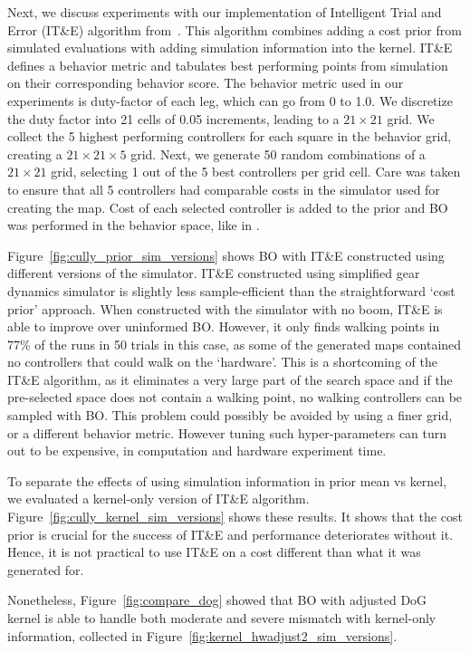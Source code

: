Next, we discuss experiments with our implementation of Intelligent Trial and Error (IT\&E) algorithm from~\citet{cully2015robots}. This algorithm combines adding a cost prior from simulated evaluations with adding simulation information into the kernel. IT\&E defines a behavior metric and tabulates best performing points from simulation on their corresponding behavior score. The behavior metric used in our experiments is duty-factor of each leg, which can go from 0 to 1.0. We discretize the duty factor into 21 cells of 0.05 increments, leading to a $21\times21$ grid. We collect the 5 highest performing controllers for each square in the behavior grid, creating a $21\times21\times5$ grid. Next, we generate 50 random combinations of a $21\times21$ grid, selecting 1 out of the 5 best controllers per grid cell. Care was taken to ensure that all 5 controllers had comparable costs in the simulator used for creating the map. 
Cost of each selected controller is added to the prior and BO was performed in the behavior space, like in \cite{cully2015robots}.

Figure~\ref{fig:cully_prior_sim_versions} shows BO with IT\&E constructed using different versions of the simulator. \mbox{IT\&E} constructed using simplified gear dynamics simulator is slightly less sample-efficient than the straightforward `cost prior' approach. When constructed with the simulator with no boom, \mbox{IT\&E} is able to improve over uninformed BO. However, it only finds walking points in 77\% of the runs in 50 trials in  this case, as some of the generated maps contained no controllers that could walk on the `hardware'. This is a shortcoming of the IT\&E algorithm, as it eliminates a very large part of the search space and if the pre-selected space does not contain a walking point, no walking controllers can be sampled with BO. This problem could possibly be avoided by using a finer grid, or a different behavior metric. However tuning such hyper-parameters can turn out to be expensive, in computation and hardware experiment time.



To separate the effects of using simulation information in prior mean vs kernel, we evaluated a kernel-only version of \mbox{IT\&E} algorithm. Figure~\ref{fig:cully_kernel_sim_versions} shows these results. It shows that the cost prior is crucial for the success of IT\&E and performance deteriorates without it. Hence, it is not practical to use IT\&E on a cost different than what it was generated for.

Nonetheless, Figure~\ref{fig:compare_dog} showed that BO with adjusted DoG kernel is able to handle both moderate and severe mismatch with kernel-only information, collected in  Figure~\ref{fig:kernel_hwadjust2_sim_versions}.

